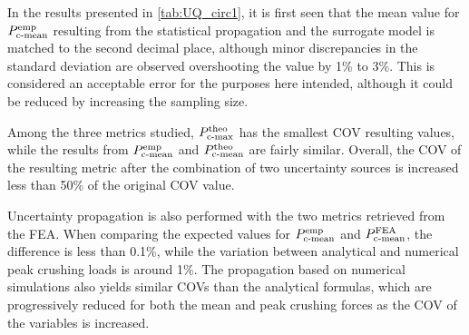 \documentclass[12pt,number,preprint,review,times]{elsarticle}
\begin{document}
In the results presented in \cref{tab:UQ_circ1}, it is first seen that the mean value for $P^{\mathrm{emp}}_{\mathrm{c{\text -}mean}}$ resulting from the statistical propagation and the surrogate model is matched to the second decimal place, although minor discrepancies in the standard deviation are observed overshooting the value by 1\% to 3\%. This is considered an acceptable error for the purposes here intended, although it could be reduced by increasing the sampling size.

Among the three metrics studied, $P^{\mathrm{theo}}_{\mathrm{c{\text -}max}}$ has the smallest COV resulting values, while the results from $P^{\mathrm{emp}}_{\mathrm{c{\text -}mean}}$ and  $P^{\mathrm{theo}}_{\mathrm{c{\text -}mean}}$ are fairly similar. Overall, the COV of the resulting metric after the combination of two uncertainty sources is increased less than 50\% of the original COV value. 

Uncertainty propagation is also performed with the two metrics retrieved from the FEA. When comparing the expected values for $P^{\mathrm{emp}}_{\mathrm{c{\text -}mean}}$ and $P^{\mathrm{FEA}}_{\mathrm{c{\text -}mean}}$, the difference is less than 0.1\%, while the variation between analytical and numerical peak crushing loads is around 1\%. The propagation based on numerical simulations also yields similar COVs than the analytical formulas, which are progressively reduced for both the mean and peak crushing forces as the COV of the variables is increased. 
\end{document}
